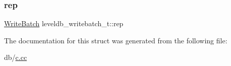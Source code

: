 \subsubsection{\texorpdfstring{rep}{rep}}
{\footnotesize\ttfamily \mbox{\hyperlink{classleveldb_1_1_write_batch}{Write\+Batch}} leveldb\+\_\+writebatch\+\_\+t\+::rep}



The documentation for this struct was generated from the following file\+:\begin{DoxyCompactItemize}
\item 
db/\mbox{\hyperlink{c_8cc}{c.\+cc}}\end{DoxyCompactItemize}
